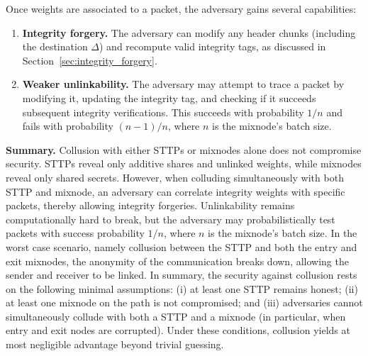 Once weights are associated to a packet, the adversary gains several capabilities:
\begin{enumerate}
  \item \textbf{Integrity forgery.} The adversary can modify any header chunks (including the destination $\Delta$) and recompute valid integrity tags, as discussed in Section~\ref{sec:integrity_forgery}.
  \item \textbf{Weaker unlinkability.} The adversary may attempt to trace a packet by modifying it, updating the integrity tag, and checking if it succeeds subsequent integrity verifications.
  This succeeds with probability $1/n$ and fails with probability $(n-1)/n$, where $n$ is the mixnode's batch size.
\end{enumerate}

\noindent\textbf{Summary.}
Collusion with either STTPs or mixnodes alone does not compromise security.
STTPs reveal only additive shares and unlinked weights, while mixnodes reveal only shared secrets.  
However, when colluding simultaneously with both STTP and mixnode, an adversary can correlate integrity weights with specific packets, thereby allowing integrity forgeries.  
Unlinkability remains computationally hard to break, but the adversary may probabilistically test packets with success probability $1/n$, where $n$ is the mixnode's batch size. 
In the worst case scenario, namely collusion between the STTP and both the entry and exit mixnodes, the anonymity of the communication breaks down, allowing the sender and receiver to be linked.
In summary, the security against collusion rests on the following minimal assumptions:
(i) at least one STTP remains honest;
(ii) at least one mixnode on the path is not compromised; and
(iii) adversaries cannot simultaneously collude with both a STTP and a mixnode (in particular, when entry and exit nodes are corrupted).
Under these conditions, collusion yields at most negligible advantage beyond trivial guessing.
